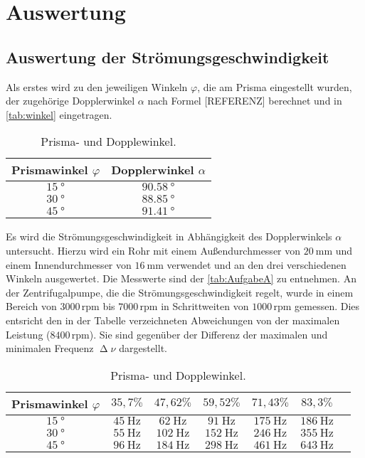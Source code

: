 \section{Auswertung}
\label{sec:Auswertung}

\subsection{Auswertung der Strömungsgeschwindigkeit}
\label{subsec:stroemi}
Als erstes wird zu den jeweiligen Winkeln $\varphi$, die am Prisma eingestellt wurden, der zugehörige Dopplerwinkel $\alpha$ nach Formel [REFERENZ]
berechnet und in \autoref{tab:winkel} eingetragen.
\begin{table}[H]
  \centering
  \caption{Prisma- und Dopplewinkel.}
  \label{tab:winkel}
  \begin{tabular}{c c}
    \toprule
    Prismawinkel $\varphi$ & Dopplerwinkel $\alpha$ \\
    \midrule
    $\SI{15}{\degree}$ & $\SI{90,58}{\degree}$ \\
    $\SI{30}{\degree}$ & $\SI{88,85}{\degree}$ \\
    $\SI{45}{\degree}$ & $\SI{91,41}{\degree}$ \\
    \bottomrule
  \end{tabular}
\end{table}

\noindent
Es wird die Strömungsgeschwindigkeit in Abhängigkeit des Dopplerwinkels $\alpha$ untersucht. Hierzu wird ein Rohr mit einem Außendurchmesser von $\SI{20}{\milli\meter}$
und einem Innendurchmesser von $\SI{16}{\milli\meter}$ verwendet und an den drei verschiedenen Winkeln ausgewertet. Die Messwerte sind der \autoref{tab:AufgabeA} zu entnehmen.
An der Zentrifugalpumpe, die die Strömungsgeschwindigkeit regelt, wurde in einem Bereich von $3000 \,\text{rpm}$ bis $7000 \,\text{rpm}$ in Schrittweiten von $1000 \,\text{rpm}$ gemessen. Dies entsricht den in der
Tabelle verzeichneten Abweichungen von der maximalen Leistung ($8400\, \text{rpm}$). Sie sind gegenüber der Differenz der maximalen und minimalen Frequenz $\upDelta \nu$ dargestellt.
\begin{table}[H]
  \centering
  \caption{Prisma- und Dopplewinkel.}
  \label{tab:AufgabeA}
  \begin{tabular}{c c c c c c c}
    \toprule
    Prismawinkel $\varphi$ & $35,7 \%$ & $47,62 \%$ & $59,52 \%$ & $71,43 \%$ & $83,3 \%$\\
    \midrule
    $\SI{15}{\degree}$ & $\SI{45}{\hertz}$ & $\SI{62}{\hertz}$ & $\SI{91}{\hertz}$ & $\SI{175}{\hertz}$ & $\SI{186}{\hertz}$ \\
    $\SI{30}{\degree}$ & $\SI{55}{\hertz}$ & $\SI{102}{\hertz}$ & $\SI{152}{\hertz}$ & $\SI{246}{\hertz}$ & $\SI{355}{\hertz}$ \\
    $\SI{45}{\degree}$ & $\SI{96}{\hertz}$ & $\SI{184}{\hertz}$ & $\SI{298}{\hertz}$ & $\SI{461}{\hertz}$ & $\SI{643}{\hertz}$ \\
    \bottomrule
  \end{tabular}
\end{table}

